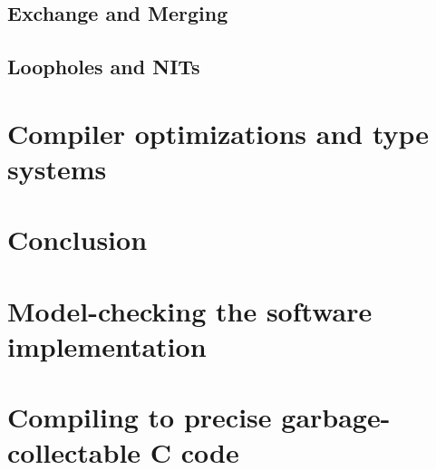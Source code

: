 \documentclass[12pt,titlepage,twoside]{article}
\begin{document}
\subsection{Exchange and Merging}
\subsection{Loopholes and NITs}

\section{Compiler optimizations and type systems}

\section{Conclusion}
\appendix
\section{Model-checking the software implementation}
\section{Compiling to precise garbage-collectable C code}
\end{document}
